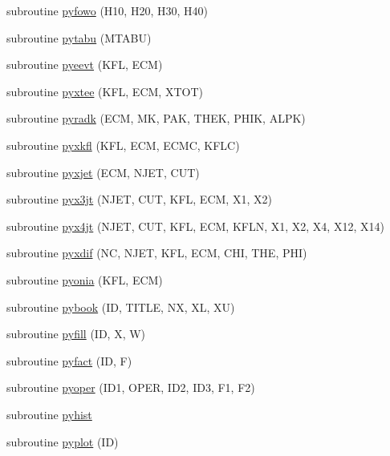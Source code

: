 \begin{DoxyCompactItemize}
subroutine \hyperlink{pythia-6_84_824_8f_abf7b5cfdcfaac6f5a57ac9bdfff6e358}{pyfowo} (H10, H20, H30, H40)
\item 
subroutine \hyperlink{pythia-6_84_824_8f_a02f810199db68652d080388e3896d4e9}{pytabu} (M\+T\+A\+BU)
\item 
subroutine \hyperlink{pythia-6_84_824_8f_a1fe450158e5c936ef62425c893c69513}{pyeevt} (K\+FL, E\+CM)
\item 
subroutine \hyperlink{pythia-6_84_824_8f_a4b38df740bd8c59b191db239bf48816c}{pyxtee} (K\+FL, E\+CM, X\+T\+OT)
\item 
subroutine \hyperlink{pythia-6_84_824_8f_a455431db0addafd011f197bca0289258}{pyradk} (E\+CM, MK, P\+AK, T\+H\+EK, P\+H\+IK, A\+L\+PK)
\item 
subroutine \hyperlink{pythia-6_84_824_8f_aab51a2a10eef9abc6a2acc8d16c62604}{pyxkfl} (K\+FL, E\+CM, E\+C\+MC, K\+F\+LC)
\item 
subroutine \hyperlink{pythia-6_84_824_8f_acaa9b0dacb1d573f221e375e29d705c0}{pyxjet} (E\+CM, N\+J\+ET, C\+UT)
\item 
subroutine \hyperlink{pythia-6_84_824_8f_abab2a3f9f28eb5eca8f8a75190e6113f}{pyx3jt} (N\+J\+ET, C\+UT, K\+FL, E\+CM, X1, X2)
\item 
subroutine \hyperlink{pythia-6_84_824_8f_a3d8e2097368a69d1101835198fe12cba}{pyx4jt} (N\+J\+ET, C\+UT, K\+FL, E\+CM, K\+F\+LN, X1, X2, X4, X12, X14)
\item 
subroutine \hyperlink{pythia-6_84_824_8f_a8c4e67bd02e0c6e202fd31548c976419}{pyxdif} (NC, N\+J\+ET, K\+FL, E\+CM, C\+HI, T\+HE, P\+HI)
\item 
subroutine \hyperlink{pythia-6_84_824_8f_ace9552b2e1344c48ed7250f2caf5b672}{pyonia} (K\+FL, E\+CM)
\item 
subroutine \hyperlink{pythia-6_84_824_8f_a06a98b7423ece43b210d6e86912b5cc9}{pybook} (ID, T\+I\+T\+LE, NX, XL, XU)
\item 
subroutine \hyperlink{pythia-6_84_824_8f_a3bbf2f94a5098ff68a11783d9aabd885}{pyfill} (ID, X, W)
\item 
subroutine \hyperlink{pythia-6_84_824_8f_a9c82afe1bb032cc74f105ca96bc7a324}{pyfact} (ID, F)
\item 
subroutine \hyperlink{pythia-6_84_824_8f_a5d3b26589df67004ca5293b12d16fd29}{pyoper} (I\+D1, O\+P\+ER, I\+D2, I\+D3, F1, F2)
\item 
subroutine \hyperlink{pythia-6_84_824_8f_afc107507b3587fc19c0008503f5b6a2a}{pyhist}
\item 
subroutine \hyperlink{pythia-6_84_824_8f_af28a134735bfae02911917eb71c7f64b}{pyplot} (ID)

\end{DoxyCompactItemize}
